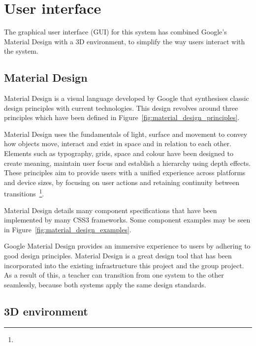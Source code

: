\section{User interface} {
\label{sec:user_interface}

	The graphical user interface (GUI) for this system has combined Google's Material Design with a 3D environment, to simplify the way users interact with the system.

	\subsection{Material Design} {
	\label{sec:material_design}

		Material Design is a visual language developed by Google that synthesises classic design principles with current technologies. This design revolves around three principles which have been defined in Figure~\ref{fig:material_design_principles}.

		

		Material Design uses the fundamentals of light, surface and movement to convey how objects move, interact and exist in space and in relation to each other. Elements such as typography, grids, space and colour have been designed to create meaning, maintain user focus and establish a hierarchy using depth effects. These principles aim to provide users with a unified experience across platforms and device sizes, by focusing on user actions and retaining continuity between transitions~\footnote{}.

		Material Design details many component specifications that have been implemented by many CSS3 frameworks. Some component examples may be seen in Figure~\ref{fig:material_design_examples}.

		

		Google Material Design provides an immersive experience to users by adhering to good design principles. Material Design is a great design tool that has been incorporated into the existing infrastructure this project and the group project. As a result of this, a teacher can transition from one system to the other seamlessly, because both systems apply the same design standards.

	}

	\subsection{3D environment} {
	\label{sec:3d_environment}

}}
